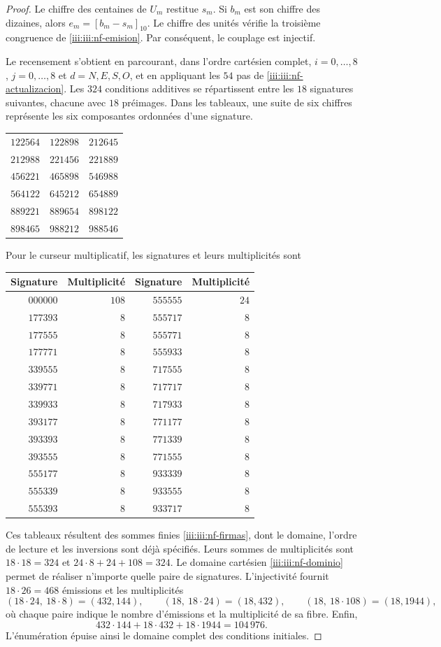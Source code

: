 \begin{proof}
Le chiffre des centaines de $U_m$ restitue $s_m$. Si $b_m$ est son chiffre des
dizaines, alors $e_m=[b_m-s_m]_{10}$. Le chiffre des unités vérifie
la troisième congruence de \eqref{iii:iii:nf-emision}. Par conséquent, le
couplage est injectif.

Le recensement s’obtient en parcourant, dans l’ordre cartésien complet,
$i=0,\ldots,8$, $j=0,\ldots,8$ et $d=N,E,S,O$, et en appliquant les $54$
pas de \eqref{iii:iii:nf-actualizacion}. Les $324$ conditions additives
se répartissent entre les $18$ signatures suivantes, chacune avec $18$
préimages. Dans les tableaux, une suite de six chiffres représente
les six composantes ordonnées d’une signature.
\begin{center}
\begin{tabular}{ccc}
$122564$&$122898$&$212645$\\
$212988$&$221456$&$221889$\\
$456221$&$465898$&$546988$\\
$564122$&$645212$&$654889$\\
$889221$&$889654$&$898122$\\
$898465$&$988212$&$988546$
\end{tabular}
\end{center}
Pour le curseur multiplicatif, les signatures et leurs multiplicités sont
\begin{center}
\begin{tabular}{rr@{\qquad}rr}
Signature&Multiplicité&Signature&Multiplicité\\ \hline
$000000$&$108$&$555555$&$24$\\
$177393$&$8$&$555717$&$8$\\
$177555$&$8$&$555771$&$8$\\
$177771$&$8$&$555933$&$8$\\
$339555$&$8$&$717555$&$8$\\
$339771$&$8$&$717717$&$8$\\
$339933$&$8$&$717933$&$8$\\
$393177$&$8$&$771177$&$8$\\
$393393$&$8$&$771339$&$8$\\
$393555$&$8$&$771555$&$8$\\
$555177$&$8$&$933339$&$8$\\
$555339$&$8$&$933555$&$8$\\
$555393$&$8$&$933717$&$8$
\end{tabular}
\end{center}
Ces tableaux résultent des sommes finies \eqref{iii:iii:nf-firmas}, dont le
domaine, l’ordre de lecture et les inversions sont déjà spécifiés. Leurs sommes
de multiplicités sont $18\cdot18=324$ et
$24\cdot8+24+108=324$. Le domaine cartésien
\eqref{iii:iii:nf-dominio} permet de réaliser n’importe quelle paire de signatures.
L’injectivité fournit $18\cdot26=468$ émissions et les
multiplicités
\[
 (18\cdot24,\ 18\cdot8)=(432,144),\qquad
 (18,\ 18\cdot24)=(18,432),\qquad
 (18,\ 18\cdot108)=(18,1944),
\]
où chaque paire indique le nombre d’émissions et la multiplicité de sa fibre.
Enfin,
\[
 432\cdot144+18\cdot432+18\cdot1944=104\,976.
\]
L’énumération épuise ainsi le domaine complet des conditions initiales.
\end{proof}

